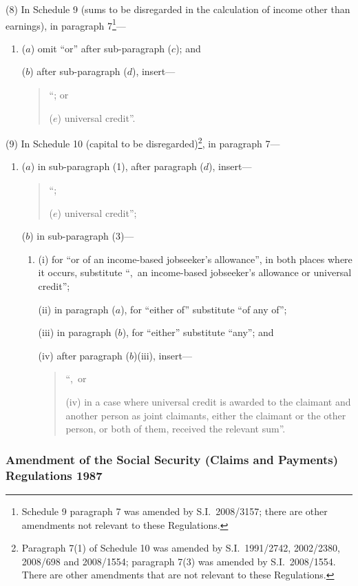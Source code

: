 \documentclass[12pt,a4paper]{article}
\begin{document}
(8) In Schedule 9 (sums to be disregarded in the calculation of income other than earnings), in paragraph 7\footnote{Schedule 9 paragraph 7 was amended by S.I.~2008/3157; there are other amendments not relevant to these Regulations.}—
\begin{enumerate}\item[]
($a$) omit “or” after sub-paragraph ($c$); and

($b$) after sub-paragraph ($d$), insert—
\begin{quotation}
“; or

($e$) universal credit”.
\end{quotation}
\end{enumerate}

(9) In Schedule 10 (capital to be disregarded)\footnote{Paragraph 7(1) of Schedule 10 was amended by S.I.~1991/2742, 2002/2380, 2008/698 and 2008/1554; paragraph 7(3) was amended by S.I.~2008/1554. There are other amendments that are not relevant to these Regulations.}, in paragraph 7—
\begin{enumerate}\item[]
($a$) in sub-paragraph (1), after paragraph ($d$), insert—
\begin{quotation}
“;

($e$) universal credit”;
\end{quotation}

($b$) in sub-paragraph (3)—
\begin{enumerate}\item[]
(i) for “or of an income-based jobseeker’s allowance”, in both places where it occurs, substitute “,~an income-based jobseeker’s allowance or universal credit”;

(ii) in paragraph ($a$), for “either of” substitute “of any of”;

(iii) in paragraph ($b$), for “either” substitute “any”; and

(iv) after paragraph ($b$)(iii), insert—
\begin{quotation}
“,~or

(iv) in a case where universal credit is awarded to the claimant and another person as joint claimants, either the claimant or the other person, or both of them, received the relevant sum”.
\end{quotation}
\end{enumerate}
\end{enumerate}

\subsubsection[29. Amendment of the Social Security (Claims and Payments) Regulations 1987]{Amendment of the Social Security (Claims and Payments) Regulations 1987}
\end{document}
